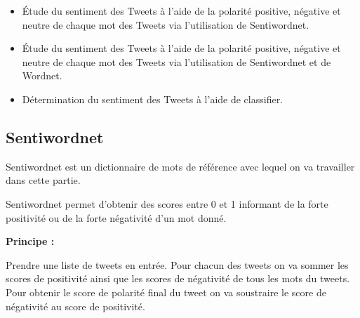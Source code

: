 \begin{itemize}
	\item Étude du sentiment des Tweets à l'aide de la polarité positive, négative et neutre de chaque mot des Tweets via l'utilisation de Sentiwordnet.
	\item Étude du sentiment des Tweets à l'aide de la polarité positive, négative et neutre de chaque mot des Tweets via l'utilisation de Sentiwordnet et de Wordnet.
	\item Détermination du sentiment des Tweets à l'aide de classifier.
\end{itemize}

\subsection{Sentiwordnet}
\par Sentiwordnet est un dictionnaire de mots de référence avec lequel on va travailler dans cette partie.
\par Sentiwordnet permet d'obtenir des scores entre 0 et 1 informant de la forte positivité ou de la forte négativité d'un mot donné. \\


\par \textbf{Principe :} \\
\par Prendre une liste de tweets en entrée. Pour chacun des tweets on va sommer les scores de positivité ainsi que les scores de négativité de tous les mots du tweets. Pour obtenir le score de polarité final du tweet on va soustraire le score de négativité au score de positivité. \\

